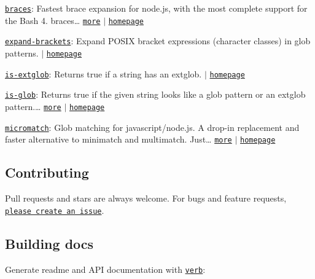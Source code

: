 \begin{DoxyItemize}
\item \href{https://www.npmjs.com/package/braces}{\tt braces}\+: Fastest brace expansion for node.\+js, with the most complete support for the Bash 4. braces… \href{https://www.npmjs.com/package/braces}{\tt more} $\vert$ \href{https://github.com/jonschlinkert/braces}{\tt homepage}
\item \href{https://www.npmjs.com/package/expand-brackets}{\tt expand-\/brackets}\+: Expand P\+O\+S\+IX bracket expressions (character classes) in glob patterns. $\vert$ \href{https://github.com/jonschlinkert/expand-brackets}{\tt homepage}
\item \href{https://www.npmjs.com/package/is-extglob}{\tt is-\/extglob}\+: Returns true if a string has an extglob. $\vert$ \href{https://github.com/jonschlinkert/is-extglob}{\tt homepage}
\item \href{https://www.npmjs.com/package/is-glob}{\tt is-\/glob}\+: Returns {\ttfamily true} if the given string looks like a glob pattern or an extglob pattern.\+… \href{https://www.npmjs.com/package/is-glob}{\tt more} $\vert$ \href{https://github.com/jonschlinkert/is-glob}{\tt homepage}
\item \href{https://www.npmjs.com/package/micromatch}{\tt micromatch}\+: Glob matching for javascript/node.\+js. A drop-\/in replacement and faster alternative to minimatch and multimatch. Just… \href{https://www.npmjs.com/package/micromatch}{\tt more} $\vert$ \href{https://github.com/jonschlinkert/micromatch}{\tt homepage}
\end{DoxyItemize}

\subsection*{Contributing}

Pull requests and stars are always welcome. For bugs and feature requests, \href{https://github.com/jonschlinkert/is-posix-bracket/issues/new}{\tt please create an issue}.

\subsection*{Building docs}

Generate readme and A\+PI documentation with \href{https://github.com/verbose/verb}{\tt verb}\+:




